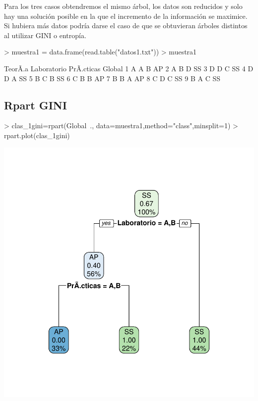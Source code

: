 \documentclass [a4paper] {article}
\begin{document}
Para los tres casos obtendremos el mismo árbol, los datos son reducidos y solo hay una solución posible en la que el incremento de la información se maximice.
Si hubiera más datos podría darse el caso de que se obtuvieran árboles distintos al utilizar GINI o entropía.
\begin{Schunk}
\begin{Sinput}
> muestra1 = data.frame(read.table("datos1.txt"))
> muestra1
\end{Sinput}
\begin{Soutput}
  TeorÃ.a Laboratorio PrÃ.cticas Global
1       A           A          B     AP
2       A           B          D     SS
3       D           D          C     SS
4       D           D          A     SS
5       B           C          B     SS
6       C           B          B     AP
7       B           B          A     AP
8       C           D          C     SS
9       B           A          C     SS
\end{Soutput}
\end{Schunk}

\newpage
\subsection{Rpart GINI}
\begin{center}
\begin{Schunk}
\begin{Sinput}
> clas_1gini=rpart(Global~., data=muestra1,method="class",minsplit=1)
> rpart.plot(clas_1gini)
\end{Sinput}
\end{Schunk}
\includegraphics{entrega-rpart1_gini}
\end{center}
\end{document}
